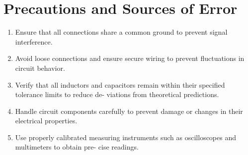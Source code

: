 \section{Precautions and Sources of Error}

    \begin{enumerate}
        \item Ensure that all connections share a common ground
        to prevent signal interference.
        \item Avoid loose connections and ensure secure wiring
        to prevent fluctuations in circuit behavior.
        \item Verify that all inductors and capacitors remain
        within their specified tolerance limits to reduce de-
        viations from theoretical predictions.
        \item Handle circuit components carefully to prevent
        damage or changes in their electrical properties.
        \item Use properly calibrated measuring instruments
        such as oscilloscopes and multimeters to obtain pre-
        cise readings.
    \end{enumerate}